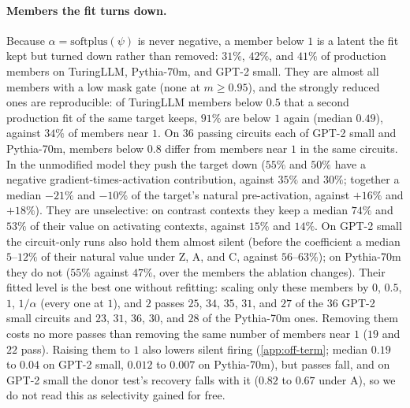 \documentclass[10pt]{article}
\begin{document}
\paragraph{Members the fit turns down.}
Because $\alpha = \mathrm{softplus}(\psi)$ is never negative, a member below $1$ is a latent the fit kept but turned down rather than removed: $31\%$, $42\%$, and $41\%$ of production members on TuringLLM, Pythia-70m, and GPT-2 small.
They are almost all members with a low mask gate (none at $m \geq 0.95$), and the strongly reduced ones are reproducible: of TuringLLM members below $0.5$ that a second production fit of the same target keeps, $91\%$ are below $1$ again (median $0.49$), against $34\%$ of members near $1$.
On $36$ passing circuits each of GPT-2 small and Pythia-70m, members below $0.8$ differ from members near $1$ in the same circuits.
In the unmodified model they push the target down ($55\%$ and $50\%$ have a negative gradient-times-activation contribution, against $35\%$ and $30\%$; together a median $-21\%$ and $-10\%$ of the target's natural pre-activation, against $+16\%$ and $+18\%$).
They are unselective: on contrast contexts they keep a median $74\%$ and $53\%$ of their value on activating contexts, against $15\%$ and $14\%$.
On GPT-2 small the circuit-only runs also hold them almost silent (before the coefficient a median $5$--$12\%$ of their natural value under Z, A, and C, against $56$--$63\%$); on Pythia-70m they do not ($55\%$ against $47\%$, over the members the ablation changes).
Their fitted level is the best one without refitting: scaling only these members by $0$, $0.5$, $1$, $1/\alpha$ (every one at $1$), and $2$ passes $25$, $34$, $35$, $31$, and $27$ of the $36$ GPT-2 small circuits and $23$, $31$, $36$, $30$, and $28$ of the Pythia-70m ones.
Removing them costs no more passes than removing the same number of members near $1$ ($19$ and $22$ pass).
Raising them to $1$ also lowers silent firing (\cref{app:off-term}; median $0.19$ to $0.04$ on GPT-2 small, $0.012$ to $0.007$ on Pythia-70m), but passes fall, and on GPT-2 small the donor test's recovery falls with it ($0.82$ to $0.67$ under A), so we do not read this as selectivity gained for free.
\end{document}
